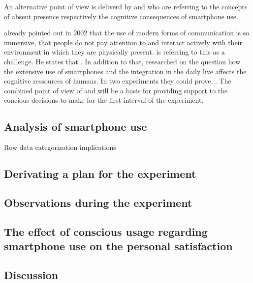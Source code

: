 \documentclass[11pt,letterpaper]{article}
\begin{document}
An alternative point of view is deliverd by \cite{gergen02} and \cite{ward17} who are referring to the concepts of absent presence respectively the cognitive consequences of smartphone use.
\begin{center}
 \autocite[][p.227]{gergen02}
\end{center}
\cite{gergen02} already pointed out in 2002 that the use of modern forms of communication is so immersive, that people do not pay attention to and interact actively with their environment in which they are physically present. \cite{gergen02} is referring to this as a challenge. He states that \autocite[][p.236]{gergen02}. In addition to that, \cite{ward17} researched on the question how the extensive use of smartphones and the integration in the daily live affects the cognitive ressources of humans. In two experiments they could prove,  \autocite[][]{ward17}. The combined point of view of \cite{gergen02} and \cite{ward17} will be a basis for providing support to the concious decisions to make for the first interval of the experiment.


\subsection*{Analysis of smartphone use}
Row data
categorization
implications

\subsection*{Derivating a plan for the experiment}

\subsection*{Observations during the experiment}

\subsection*{The effect of conscious usage regarding smartphone use on the personal satisfaction}

\subsection*{Discussion}

\newpage





\printbibliography 
\end{document}
